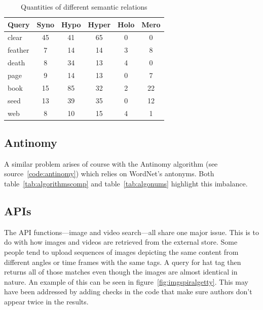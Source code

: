 \begin{table}[!htbp]
\centering
\caption[Quantities of different semantic relations]{Quantities of different semantic relations}
\label{tab:semnum}
\begin{tabu}{lccccc}
\toprule
\textbf{Query} & \textbf{Syno} & \textbf{Hypo} & \textbf{Hyper} & \textbf{Holo} & \textbf{Mero} \\ \midrule
clear   & 45   & 41   & 65    & 0    & 0    \\
feather & 7    & 14   & 14    & 3    & 8    \\
death   & 8    & 34   & 13    & 4    & 0    \\
page    & 9    & 14   & 13    & 0    & 7    \\
book    & 15   & 85   & 32    & 2    & 22   \\
seed    & 13   & 39   & 35    & 0    & 12   \\
web     & 8    & 10   & 15    & 4    & 1    \\ \bottomrule
\end{tabu}
\end{table}


\subsection{Antinomy}

A similar problem arises of course with the Antinomy algorithm (see source~\ref{code:antinomy}) which relies on WordNet's antonyms. Both table~\ref{tab:algorithmscomp} and table~\ref{tab:algonums} highlight this imbalance.


\subsection{APIs}
\label{s:apis}

The \ac{API} functions---image and video search---all share one major issue. This is to do with how images and videos are retrieved from the external store. Some people tend to upload sequences of images depicting the same content from different angles or time frames with the same tags. A query for hat tag then returns all of those matches even though the images are almost identical in nature. An example of this can be seen in figure~\ref{fig:imgspiralgetty}. This may have been addressed by adding checks in the code that make sure authors don't appear twice in the results.

